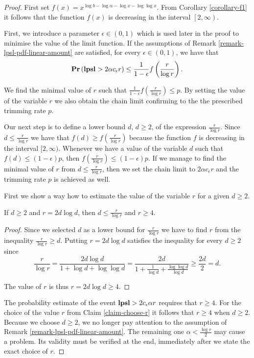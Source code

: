 \begin{proof}
First set $f(x) = x ^ {\log b - \log \alpha - \log x - \log \log x}$. From Corollary \ref{corollary-f1} it follows that the function $f(x)$ is decreasing in the interval $\left[2, \infty \right)$.

First, we introduce a parameter $\epsilon \in (0, 1)$ which is used later in the proof to minimise the value of the limit function. If the assumptions of Remark \ref{remark-lpsl-pdf-linear-amount} are satisfied, for every $\epsilon \in (0, 1)$, we have that 
\[
	\mathbf{Pr}\left(\mathbf{lpsl} > 2 \alpha c_\epsilon r\right) \leq \frac{1}{1 - \epsilon} f\left(\frac{r}{\log r}\right) \text{.}
\]

We find the minimal value of $r$ such that $\frac{1}{1 - \epsilon} f\left(\frac{r}{\log r}\right) \leq p$. By setting the value of the variable $r$ we also obtain the chain limit confirming to the the prescribed trimming rate $p$. 

Our next step is to define a lower bound $d$, $d \geq 2$, of the expression $\frac{r}{\log r}$. Since $d \leq \frac{r}{\log r}$ we have that $f(d) \geq f\left(\frac{r}{\log r}\right)$ because the function $f$ is decreasing in the interval $[2, \infty)$. Whenever we have a value of the variable $d$ such that $f(d) \leq (1 - \epsilon) p$, then $f\left(\frac{r}{\log r}\right) \leq (1- \epsilon) p$. If we manage to find the minimal value of $r$ from $d \leq \frac{r}{\log r}$, then we set the chain limit to $2 \alpha c_\epsilon r$ and the trimming rate $p$ is achieved as well. 

First we show a way how to estimate the value of the variable $r$ for a given $d \geq 2$. 
\begin{claim}
\label{claim-choose-r}
If $d \geq 2$ and $r = 2d \log d$, then $d \leq \frac{r}{\log r}$ and $r \geq 4$.
\end{claim}
\begin{proof}
Since we selected $d$ as a lower bound for $\frac{r}{\log r}$ we have to find $r$ from the inequality $\frac{r}{\log r} \geq d$. Putting $r = 2 d \log d$ satisfies the inequality for every $d \geq 2$ since
\[
\frac{r}{\log r} = \frac{2 d \log d}{1 + \log d + \log \log d} = \frac{2 d}{1 + \frac{1}{\log d} + \frac{\log \log d}{\log d}} \geq \frac{2d}{2} = d \text{.}
\]

The value of $r$ is thus $r = 2d \log d \geq 4$.
\end{proof}

The probability estimate of the event $\mathbf{lpsl} > 2 c_\epsilon \alpha r$ requires that $r \geq 4$. For the choice of the value $r$ from Claim \ref{claim-choose-r} it follows that $r \geq 4$ when $d \geq 2$. Because we choose $d \geq 2$, we no longer pay attention to the assumption of Remark \ref{remark-lpsl-pdf-linear-amount}. The remaining one $\alpha < \frac{\log r}{2}$ may cause a problem. Its validity must be verified at the end, immediately after we state the exact choice of $r$.


\end{proof}
